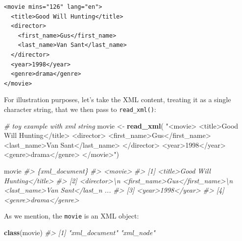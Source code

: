 \documentclass[
]{book}
\newenvironment{Shaded}{\begin{snugshade}}{\end{snugshade}}
\newcommand{\CommentTok}[1]{\textcolor[rgb]{0.56,0.35,0.01}{\textit{#1}}}
\newcommand{\FunctionTok}[1]{\textcolor[rgb]{0.13,0.29,0.53}{\textbf{#1}}}
\newcommand{\NormalTok}[1]{#1}
\newcommand{\OtherTok}[1]{\textcolor[rgb]{0.56,0.35,0.01}{#1}}
\newcommand{\StringTok}[1]{\textcolor[rgb]{0.31,0.60,0.02}{#1}}
\begin{document}
\begin{verbatim}
<movie mins="126" lang="en">
  <title>Good Will Hunting</title>
  <director>
    <first_name>Gus</first_name>
    <last_name>Van Sant</last_name>
  </director>
  <year>1998</year>
  <genre>drama</genre>
</movie>
\end{verbatim}

For illustration purposes, let's take the XML content, treating it as a single
character string, that we then pass to \texttt{read\_xml()}:

\begin{Shaded}
\begin{Highlighting}[]
\CommentTok{\# toy example with xml string}
\NormalTok{movie }\OtherTok{\textless{}{-}} \FunctionTok{read\_xml}\NormalTok{(}
\StringTok{"\textless{}movie\textgreater{}}
\StringTok{\textless{}title\textgreater{}Good Will Hunting\textless{}/title\textgreater{}}
\StringTok{\textless{}director\textgreater{}}
\StringTok{\textless{}first\_name\textgreater{}Gus\textless{}/first\_name\textgreater{}}
\StringTok{\textless{}last\_name\textgreater{}Van Sant\textless{}/last\_name\textgreater{}}
\StringTok{\textless{}/director\textgreater{}}
\StringTok{\textless{}year\textgreater{}1998\textless{}/year\textgreater{}}
\StringTok{\textless{}genre\textgreater{}drama\textless{}/genre\textgreater{}}
\StringTok{\textless{}/movie\textgreater{}"}\NormalTok{)}

\NormalTok{movie}
\CommentTok{\#\textgreater{} \{xml\_document\}}
\CommentTok{\#\textgreater{} \textless{}movie\textgreater{}}
\CommentTok{\#\textgreater{} [1] \textless{}title\textgreater{}Good Will Hunting\textless{}/title\textgreater{}}
\CommentTok{\#\textgreater{} [2] \textless{}director\textgreater{}\textbackslash{}n  \textless{}first\_name\textgreater{}Gus\textless{}/first\_name\textgreater{}\textbackslash{}n  \textless{}last\_name\textgreater{}Van Sant\textless{}/last\_n ...}
\CommentTok{\#\textgreater{} [3] \textless{}year\textgreater{}1998\textless{}/year\textgreater{}}
\CommentTok{\#\textgreater{} [4] \textless{}genre\textgreater{}drama\textless{}/genre\textgreater{}}
\end{Highlighting}
\end{Shaded}

As we mention, the \texttt{movie} is an XML object:

\begin{Shaded}
\begin{Highlighting}[]
\FunctionTok{class}\NormalTok{(movie)}
\CommentTok{\#\textgreater{} [1] "xml\_document" "xml\_node"}
\end{Highlighting}
\end{Shaded}
\end{document}
